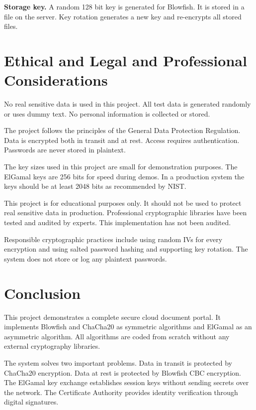 \documentclass[12pt,a4paper]{article}
\begin{document}
\textbf{Storage key.} A random 128 bit key is generated for Blowfish. It is stored in a file on the server. Key rotation generates a new key and re-encrypts all stored files.


\section{Ethical and Legal and Professional Considerations}

No real sensitive data is used in this project. All test data is generated randomly or uses dummy text. No personal information is collected or stored.

The project follows the principles of the General Data Protection Regulation. Data is encrypted both in transit and at rest. Access requires authentication. Passwords are never stored in plaintext.

The key sizes used in this project are small for demonstration purposes. The ElGamal keys are 256 bits for speed during demos. In a production system the keys should be at least 2048 bits as recommended by NIST.

This project is for educational purposes only. It should not be used to protect real sensitive data in production. Professional cryptographic libraries have been tested and audited by experts. This implementation has not been audited.

Responsible cryptographic practices include using random IVs for every encryption and using salted password hashing and supporting key rotation. The system does not store or log any plaintext passwords.


\section{Conclusion}

This project demonstrates a complete secure cloud document portal. It implements Blowfish and ChaCha20 as symmetric algorithms and ElGamal as an asymmetric algorithm. All algorithms are coded from scratch without any external cryptography libraries.

The system solves two important problems. Data in transit is protected by ChaCha20 encryption. Data at rest is protected by Blowfish CBC encryption. The ElGamal key exchange establishes session keys without sending secrets over the network. The Certificate Authority provides identity verification through digital signatures.
\end{document}
